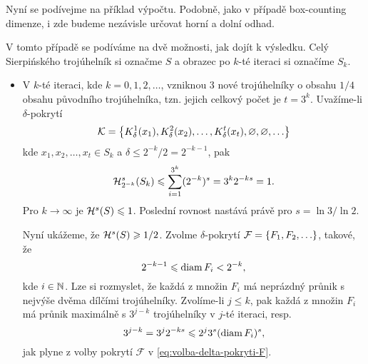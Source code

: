 Nyní se podívejme na příklad výpočtu. Podobně, jako v případě box-counting dimenze, i zde budeme nezávisle určovat horní a dolní odhad.
\begin{example}\label{ex:sierpinskeho-trojuhelnik-hd-dimenze}
    V tomto případě se podíváme na dvě možnosti, jak dojít k výsledku. Celý Sierpińského trojúhelník si označme $S$ a obrazec po $k$-té iteraci si označíme $S_k$.
    \begin{itemize}
        \item V $k$-té iteraci, kde $k=0,1,2,\ldots$, vzniknou 3 nové trojúhelníky o obsahu $1/4$ obsahu původního trojúhelníka, tzn. jejich celkový počet je $t=3^k$. Uvažíme-li $\delta$-pokrytí
        \[\mathcal{K}=\set{K_\delta^1(x_1),K_\delta^2(x_2),\ldots,K_\delta^t(x_t),\emptyset,\emptyset,\ldots}\]
        kde $x_1,x_2,\ldots,x_t\in S_k$ a $\delta\leqslant 2^{-k}/2=2^{-k-1}$, pak
        \[\hausdorffdeltameasure{s}{2^{-k}}(S_k)\leqslant\sum_{i=1}^{3^k}(2^{-k})^s=3^k2^{-ks}=1.\]
        Pro $k\to\infty$ je $\hausdorffmeasure{s}(S)\leqslant 1$. Poslední rovnost nastává právě pro $s=\ln{3}/\ln{2}$.

        Nyní ukážeme, že $\hausdorffmeasure{s}(S)\geqslant 1/2$. Zvolme $\delta$-pokrytí $\mathcal{F}=\set{F_1,F_2,\ldots}$, takové, že
        \begin{equation}\label{eq:volba-delta-pokryti-F}
            2^{-k-1}\leqslant\diam{F_i}<2^{-k},
        \end{equation}
        kde $i\in\N$. Lze si rozmyslet, že každá z množin $F_i$ má neprázdný průnik s nejvýše dvěma dílčími trojúhelníky. Zvolíme-li $j\leqslant k$, pak každá z množin $F_i$ má průnik maximálně s $3^{j-k}$ trojúhelníky v $j$-té iteraci, resp.
        \[3^{j-k}=3^j2^{-ks}\leqslant2^j3^s(\diam{F_i})^s,\]
        jak plyne z volby pokrytí $\mathcal{F}$ v \eqref{eq:volba-delta-pokryti-F}.
    \end{itemize}
\end{example}